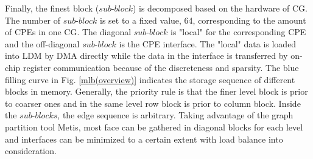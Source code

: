 \documentclass[5p,times]{elsarticle}
\begin{document}
Finally, the finest block ($sub$-$block$) is decomposed based on the hardware of CG. The number of $sub$-$block$ is set to a fixed value, 64, corresponding to the amount of CPEs in one CG. The diagonal $sub$-$block$ is "local" for the corresponding CPE and the off-diagonal $sub$-$block$ is the CPE interface. The "local" data is loaded into LDM by DMA directly while the data in the interface is transferred by on-chip register communication because of the discreteness and sparsity. The blue filling curve in Fig. \ref{mlb(overview)} indicates the storage sequence of different blocks in memory. Generally, the priority rule is that the finer level block is prior to coarser ones and in the same level row block is prior to column block. Inside the $sub$-$blocks$, the edge sequence is arbitrary. Taking advantage of the graph partition tool Metis, most face can be gathered in diagonal blocks for each level and interfaces can be minimized to a certain extent with load balance into consideration. 
\end{document}
